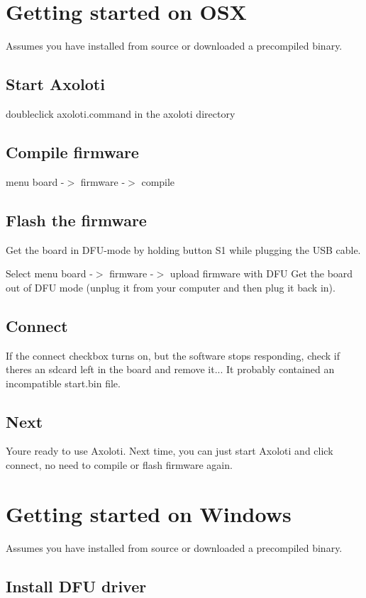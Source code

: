 \hypertarget{getting_started_getting_started_on_osx}{}\section{Getting started on O\+SX}\label{getting_started_getting_started_on_osx}
Assumes you have installed from source or downloaded a precompiled binary. \subsection*{Start Axoloti}

doubleclick axoloti.\+command in the axoloti directory \subsection*{Compile firmware}

menu board -\/$>$ firmware -\/$>$ compile \subsection*{Flash the firmware}

Get the board in D\+F\+U-\/mode by holding button S1 while plugging the U\+SB cable.

Select menu board -\/$>$ firmware -\/$>$ upload firmware with D\+FU Get the board out of D\+FU mode (unplug it from your computer and then plug it back in). \subsection*{Connect}

If the connect checkbox turns on, but the software stops responding, check if there\textquotesingle{}s an sdcard left in the board and remove it... It probably contained an incompatible start.\+bin file. \subsection*{Next}

You\textquotesingle{}re ready to use Axoloti. Next time, you can just start Axoloti and click connect, no need to compile or flash firmware again.\hypertarget{getting_started_getting_started_on_win}{}\section{Getting started on Windows}\label{getting_started_getting_started_on_win}
Assumes you have installed from source or downloaded a precompiled binary. \subsection*{Install D\+FU driver}

